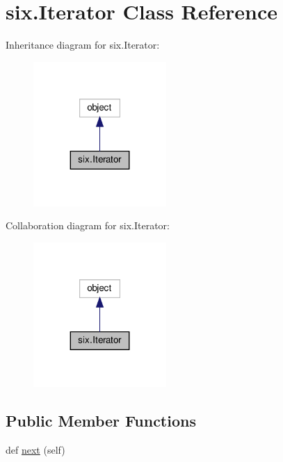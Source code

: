 \hypertarget{classsix_1_1Iterator}{}\section{six.\+Iterator Class Reference}
\label{classsix_1_1Iterator}


Inheritance diagram for six.\+Iterator\+:
\nopagebreak
\begin{figure}[H]
\begin{center}
\leavevmode
\includegraphics[width=143pt]{classsix_1_1Iterator__inherit__graph}
\end{center}
\end{figure}


Collaboration diagram for six.\+Iterator\+:
\nopagebreak
\begin{figure}[H]
\begin{center}
\leavevmode
\includegraphics[width=143pt]{classsix_1_1Iterator__coll__graph}
\end{center}
\end{figure}
\subsection*{Public Member Functions}
\begin{DoxyCompactItemize}
\item 
def \hyperlink{classsix_1_1Iterator_a2248c904e3068509258d20d89c2d64fd}{next} (self)
\end{DoxyCompactItemize}


